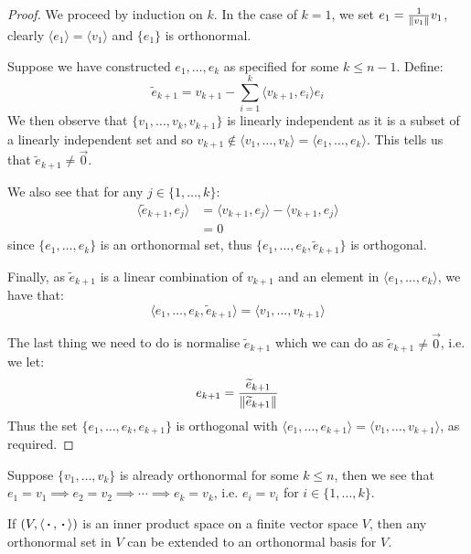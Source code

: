 \documentclass[../main.tex]{subfiles}
\begin{document}
\begin{proof}
  We proceed by induction on $k$.
  In the case of $k = 1$, we set $e_1 = \frac{1}{\left\lVert v_1 \right\rVert} v_1$, clearly $\langle e_1 \rangle = \langle v_1 \rangle$ and $\{e_1\}$ is orthonormal.

  Suppose we have constructed $e_1, \ldots, e_k$ as specified for some $k \leq n - 1$.
  Define:
  \[
    \widetilde{e}_{k + 1} = v_{k + 1} - \sum_{i = 1}^{k} \langle v_{k + 1}, e_i \rangle e_i
  \]
  We then observe that $\{v_1, \ldots, v_k, v_{k + 1}\}$ is linearly independent as it is a subset of a linearly independent set and so $v_{k + 1} \notin \langle v_1, \ldots, v_k \rangle = \langle e_1, \ldots, e_k \rangle$.
  This tells us that $\widetilde{e}_{k + 1} \neq \vec{0}$.

  We also see that for any $j \in \{1, \ldots, k\}$:
  \begin{align*}
    \langle \widetilde{e}_{k + 1}, e_j \rangle &= \langle v_{k + 1}, e_j \rangle - \langle v_{k + 1}, e_j \rangle \\
                                               &= 0
  \end{align*}
  since $\{e_1, \ldots, e_k\}$ is an orthonormal set, thus $\{e_1, \ldots, e_k, \widetilde{e}_{k + 1}\}$ is orthogonal.

  Finally, as $\widetilde{e}_{k + 1}$ is a linear combination of $v_{k + 1}$ and an element in $\langle e_1, \ldots, e_k \rangle$, we have that:
  \[
    \langle e_1, \ldots, e_k, \widetilde{e}_{k + 1} \rangle = \langle v_1, \ldots, v_{k + 1} \rangle
  \]

  The last thing we need to do is normalise $\widetilde{e}_{k + 1}$ which we can do as $\widetilde{e}_{k + 1} \neq \vec{0}$, i.e. we let:
  \[
    e_{k + 1} = \frac{\widetilde{e}_{k + 1}}{\left\lVert \widetilde{e}_{k + 1} \right\rVert}
  \]
  Thus the set $\{e_1, \ldots, e_k, e_{k + 1}\}$ is orthogonal with $\langle e_1, \ldots, e_{k + 1} \rangle = \langle v_1, \ldots, v_{k + 1} \rangle$, as required.
\end{proof}
\begin{remark}
  Suppose $\{v_1, \ldots, v_k\}$ is already orthonormal for some $k \leq n$, then we see that $e_1 = v_1 \implies e_2 = v_2 \implies \cdots \implies e_k = v_k$, i.e. $e_i = v_i$ for $i \in \{1, \ldots, k\}$.
\end{remark}
\begin{corollary}
  If $(V, \langle {\hspace{0.18em}\boldsymbol{\cdot}\hspace{0.18em}}, {\hspace{0.18em}\boldsymbol{\cdot}\hspace{0.18em}} \rangle)$ is an inner product space on a finite vector space $V$, then any orthonormal set in $V$ can be extended to an orthonormal basis for $V$. \label{orthoBasis}
\end{corollary}
\end{document}
